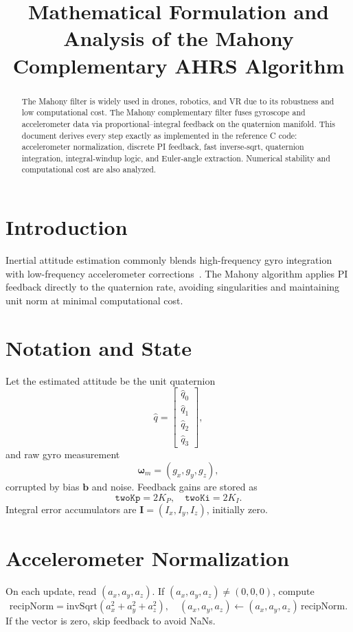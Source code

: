 \documentclass[12pt,letterpaper]{article}
\title{Mathematical Formulation and Analysis of the Mahony Complementary AHRS Algorithm}
\date{}
\begin{document}
\maketitle

\begin{abstract}
The Mahony filter is widely used in drones, robotics, and VR due to its robustness and low computational cost. The Mahony complementary filter fuses gyroscope and accelerometer data via proportional–integral feedback on the quaternion manifold.  This document derives every step exactly as implemented in the reference C code: accelerometer normalization, discrete PI feedback, fast inverse‐sqrt, quaternion integration, integral‐windup logic, and Euler‐angle extraction.  Numerical stability and computational cost are also analyzed.
\end{abstract}

\section{Introduction}
Inertial attitude estimation commonly blends high-frequency gyro integration with low-frequency accelerometer corrections~\cite{Mahony2008}.  The Mahony algorithm applies PI feedback directly to the quaternion rate, avoiding singularities and maintaining unit norm at minimal computational cost.

\section{Notation and State}
Let the estimated attitude be the unit quaternion 
\[
\hat q = \begin{bmatrix}\hat q_0\\\hat q_1\\\hat q_2\\\hat q_3\end{bmatrix},
\]
and raw gyro measurement 
\[
\boldsymbol\omega_m = (g_x,g_y,g_z),
\]
corrupted by bias $\mathbf b$ and noise.  Feedback gains are stored as 
\[
\texttt{twoKp} = 2K_P,\quad \texttt{twoKi} = 2K_I.
\]
Integral error accumulators are 
\(\mathbf I=(I_x,I_y,I_z)\), initially zero.

\section{Accelerometer Normalization}
On each update, read $(a_x,a_y,a_z)$.  If $(a_x,a_y,a_z)\neq(0,0,0)$, compute
\[
\text{recipNorm} = \mathrm{invSqrt}(a_x^2+a_y^2+a_z^2),
\quad
(a_x,a_y,a_z)\leftarrow (a_x,a_y,a_z)\,\text{recipNorm}.
\]
If the vector is zero, skip feedback to avoid NaNs.
\end{document}
